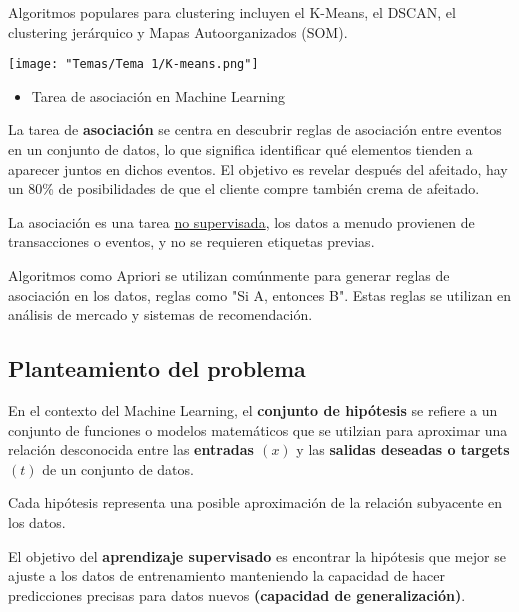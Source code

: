 Algoritmos populares para clustering incluyen el K-Means, el DSCAN, el clustering jerárquico y Mapas Autoorganizados (SOM).

\begin{center}
\texttt{[image: "Temas/Tema 1/K-means.png"]}
\end{center}
\begin{itemize}[label=\color{red}\textbullet, leftmargin=*]
	\item \color{lightblue}Tarea de asociación en Machine Learning
\end{itemize}

La tarea de \textbf{asociación} se centra en descubrir reglas de asociación entre eventos en un conjunto de datos, lo que significa identificar qué elementos tienden a aparecer juntos en dichos eventos. El objetivo es revelar después del afeitado, hay un 80\% de posibilidades de que el cliente compre también crema de afeitado.

La asociación es una tarea \underline{no supervisada}, los datos a menudo provienen de transacciones o eventos, y no se requieren etiquetas previas.

Algoritmos como Apriori se utilizan comúnmente para generar reglas de asociación en los datos, reglas como "Si A, entonces B". Estas reglas se utilizan en análisis de mercado y sistemas de recomendación.
\subsection{Planteamiento del problema}
En el contexto del Machine Learning, el \textbf{conjunto de hipótesis} se refiere a un conjunto de funciones o modelos matemáticos que se utilzian para aproximar una relación desconocida entre las \textbf{entradas $(x)$} y las \textbf{salidas deseadas o targets $(t)$} de un conjunto de datos.

Cada hipótesis representa una posible aproximación de la relación subyacente en los datos.

El objetivo del \textbf{aprendizaje supervisado} es encontrar la hipótesis que mejor se ajuste a los datos de entrenamiento manteniendo la capacidad de hacer predicciones precisas para datos nuevos \textbf{(capacidad de generalización)}.

\begin{center}
\end{center}

